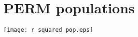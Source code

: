 \section{PERM populations}

\begin{Figure}
  \centerfloat
     \texttt{[image: r\_squared\_pop.eps]}
 \label{fig:Inst_temp}
\end{Figure}
